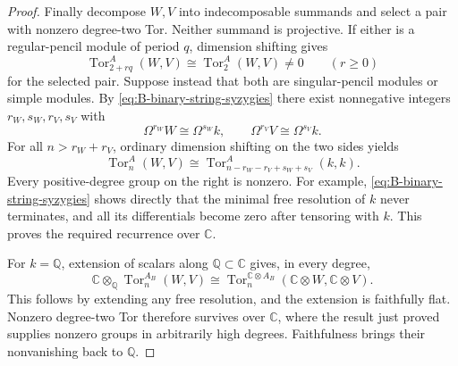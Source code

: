 \begin{proof}
Finally decompose $W,V$ into indecomposable summands and select
a pair with nonzero degree-two Tor.  Neither summand is
projective.  If either is a regular-pencil module of period
$q$, dimension shifting gives
\[
 \operatorname{Tor}_{2+rq}^{A}(W,V)
       \cong\operatorname{Tor}_{2}^{A}(W,V)\ne0
       \qquad(r\geq0)
\]
for the selected pair.  Suppose instead that both are
singular-pencil modules or simple modules.  By
\eqref{eq:B-binary-string-syzygies} there exist
nonnegative integers $r_W,s_W,r_V,s_V$ with
\[
 \Omega^{r_W}W\cong\Omega^{s_W}k,
 \qquad
 \Omega^{r_V}V\cong\Omega^{s_V}k.
\]
For all $n>r_W+r_V$, ordinary dimension shifting on the two
sides yields
\[
 \operatorname{Tor}_n^A(W,V)
 \cong
 \operatorname{Tor}_{n-r_W-r_V+s_W+s_V}^A(k,k).
\]
Every positive-degree group on the right is nonzero.  For
example, \eqref{eq:B-binary-string-syzygies} shows directly that the minimal free resolution
of $k$ never terminates, and all its differentials become zero
after tensoring with $k$.  This proves the required recurrence
over $\mathbb C$.

For $k=\mathbb Q$, extension of scalars along
$\mathbb Q\subset\mathbb C$ gives, in every degree,
\[
 \mathbb C\otimes_{\mathbb Q}\operatorname{Tor}_n^{A_B}(W,V)
 \cong
 \operatorname{Tor}_n^{\mathbb C\otimes A_B}
       (\mathbb C\otimes W,\mathbb C\otimes V).
\]
This follows by extending any free resolution, and the extension
is faithfully flat.  Nonzero degree-two Tor therefore survives
over $\mathbb C$, where the result just proved supplies nonzero
groups in arbitrarily high degrees.  Faithfulness brings their
nonvanishing back to $\mathbb Q$.
\end{proof}
